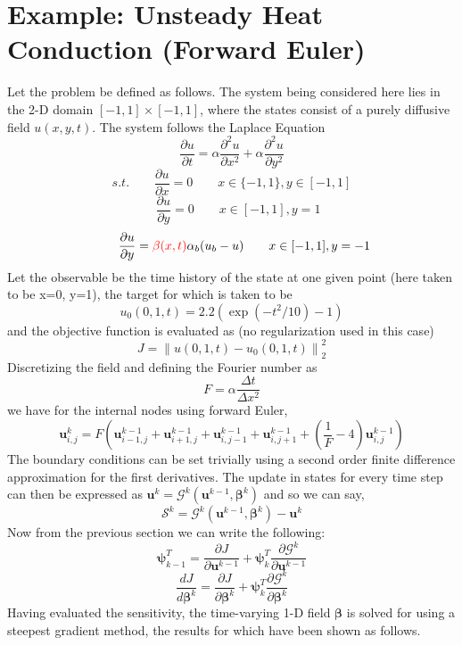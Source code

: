 \documentclass{article}
\begin{document}
\section{Example: Unsteady Heat Conduction (Forward Euler)}
Let the problem be defined as follows. The system being considered here lies in the 2-D domain $[-1,1]\times[-1,1]$, where the states consist of a purely diffusive field
$u(x,y,t)$. The system follows the Laplace Equation
$$
\frac{\partial u}{\partial t} = \alpha\frac{\partial^2 u}{\partial x^2} + \alpha\frac{\partial^2 u}{\partial y^2}
$$
$$
s.t.\qquad \frac{\partial u}{\partial x} = 0 \qquad x\in\lbrace-1,1\rbrace, y\in[-1,1]
$$
$$
\qquad \frac{\partial u}{\partial y}=0 \qquad x\in[-1,1], y=1\quad
$$
$$
\qquad \frac{\partial u}{\partial y}={\color{red}\beta(x,t)}\alpha_b(u_b-u) \qquad x\in[-1,1], y=-1
$$
Let the observable be the time history of the state at one given point (here taken to be x=0, y=1), the target for which is taken to be 
$$
u_0(0,1,t) = 2.2(\exp(-t^2/10)-1)
$$
and the objective function is evaluated as (no regularization used in this case)
$$
J = \left\lVert u(0,1,t) - u_0(0,1,t) \right\rVert_2^2
$$
Discretizing the field and defining the Fourier number as $$F=\alpha\frac{\Delta t}{\Delta x^2}$$ we have for the internal nodes using forward Euler,
$$
\boldsymbol{u}^{k}_{i,j} = F\left(\boldsymbol{u}^{k-1}_{i-1,j} + \boldsymbol{u}^{k-1}_{i+1,j} + \boldsymbol{u}^{k-1}_{i,j-1} + 
			   \boldsymbol{u}^{k-1}_{i,j+1} + \left(\frac{1}{F}-4\right) \boldsymbol{u}^{k-1}_{i,j}\right)
$$
The boundary conditions can be set trivially using a second order finite difference approximation for the first derivatives. The update in states for every time step can then
be expressed as $\boldsymbol{u}^k = \boldsymbol{\mathcal{G}}^k(\boldsymbol{u}^{k-1}, \boldsymbol{\beta}^k)$ and so we can say,
$$
\boldsymbol{\mathcal{S}}^k = \boldsymbol{\mathcal{G}}^k(\boldsymbol{u}^{k-1}, \boldsymbol{\beta}^k) - \boldsymbol{u}^k
$$
Now from the previous section we can write the following:
$$
\boldsymbol{\psi}_{k-1}^T = \frac{\partial J}{\partial \boldsymbol{u}^{k-1}} + \boldsymbol{\psi}_k^T\frac{\partial\boldsymbol{\mathcal{G}}^k}{\partial \boldsymbol{u}^{k-1}}
$$
$$
\frac{dJ}{d\boldsymbol{\beta}^k} = \frac{\partial J}{\partial \boldsymbol{\beta}^k} 
                                   + \boldsymbol{\psi}_k^T\frac{\partial\boldsymbol{\mathcal{G}}^k}{\partial \boldsymbol{\beta}^k}
$$
Having evaluated the sensitivity, the time-varying 1-D field $\boldsymbol\beta$ is solved for using a steepest gradient method, the results for which have been shown as follows.
\end{document}
